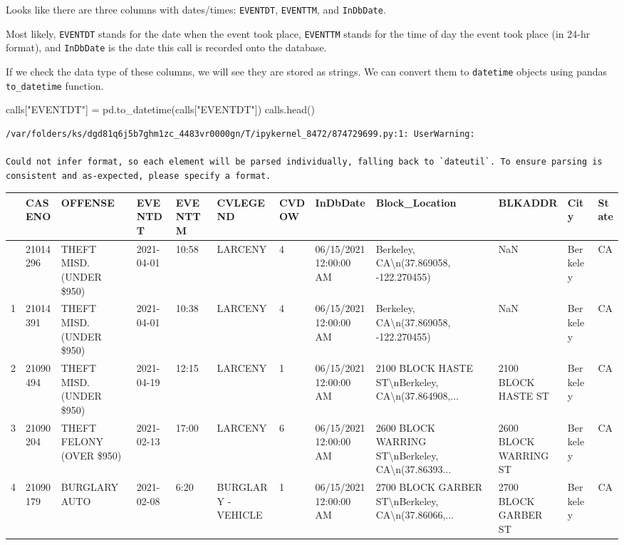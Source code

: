 \documentclass[
  letterpaper,
  DIV=11,
  numbers=noendperiod]{scrreprt}
\newenvironment{Shaded}{\begin{snugshade}}{\end{snugshade}}
\newcommand{\NormalTok}[1]{\textcolor[rgb]{0.00,0.23,0.31}{#1}}
\newcommand{\OperatorTok}[1]{\textcolor[rgb]{0.37,0.37,0.37}{#1}}
\newcommand{\StringTok}[1]{\textcolor[rgb]{0.13,0.47,0.30}{#1}}
\begin{document}
Looks like there are three columns with dates/times: \texttt{EVENTDT},
\texttt{EVENTTM}, and \texttt{InDbDate}.

Most likely, \texttt{EVENTDT} stands for the date when the event took
place, \texttt{EVENTTM} stands for the time of day the event took place
(in 24-hr format), and \texttt{InDbDate} is the date this call is
recorded onto the database.

If we check the data type of these columns, we will see they are stored
as strings. We can convert them to \texttt{datetime} objects using
pandas \texttt{to\_datetime} function.

\begin{Shaded}
\begin{Highlighting}[]
\NormalTok{calls[}\StringTok{"EVENTDT"}\NormalTok{] }\OperatorTok{=}\NormalTok{ pd.to\_datetime(calls[}\StringTok{"EVENTDT"}\NormalTok{])}
\NormalTok{calls.head()}
\end{Highlighting}
\end{Shaded}

\begin{verbatim}
/var/folders/ks/dgd81q6j5b7ghm1zc_4483vr0000gn/T/ipykernel_8472/874729699.py:1: UserWarning:

Could not infer format, so each element will be parsed individually, falling back to `dateutil`. To ensure parsing is consistent and as-expected, please specify a format.
\end{verbatim}

\begin{longtable}[]{@{}llllllllllll@{}}
\toprule\noalign{}
& CASENO & OFFENSE & EVENTDT & EVENTTM & CVLEGEND & CVDOW & InDbDate &
Block\_Location & BLKADDR & City & State \\
\midrule\noalign{}
\endhead
\bottomrule\noalign{}
\endlastfoot
0 & 21014296 & THEFT MISD. (UNDER \$950) & 2021-04-01 & 10:58 & LARCENY
& 4 & 06/15/2021 12:00:00 AM & Berkeley, CA\textbackslash n(37.869058,
-122.270455) & NaN & Berkeley & CA \\
1 & 21014391 & THEFT MISD. (UNDER \$950) & 2021-04-01 & 10:38 & LARCENY
& 4 & 06/15/2021 12:00:00 AM & Berkeley, CA\textbackslash n(37.869058,
-122.270455) & NaN & Berkeley & CA \\
2 & 21090494 & THEFT MISD. (UNDER \$950) & 2021-04-19 & 12:15 & LARCENY
& 1 & 06/15/2021 12:00:00 AM & 2100 BLOCK HASTE
ST\textbackslash nBerkeley, CA\textbackslash n(37.864908,... & 2100
BLOCK HASTE ST & Berkeley & CA \\
3 & 21090204 & THEFT FELONY (OVER \$950) & 2021-02-13 & 17:00 & LARCENY
& 6 & 06/15/2021 12:00:00 AM & 2600 BLOCK WARRING
ST\textbackslash nBerkeley, CA\textbackslash n(37.86393... & 2600 BLOCK
WARRING ST & Berkeley & CA \\
4 & 21090179 & BURGLARY AUTO & 2021-02-08 & 6:20 & BURGLARY - VEHICLE &
1 & 06/15/2021 12:00:00 AM & 2700 BLOCK GARBER
ST\textbackslash nBerkeley, CA\textbackslash n(37.86066,... & 2700 BLOCK
GARBER ST & Berkeley & CA \\
\end{longtable}
\end{document}
